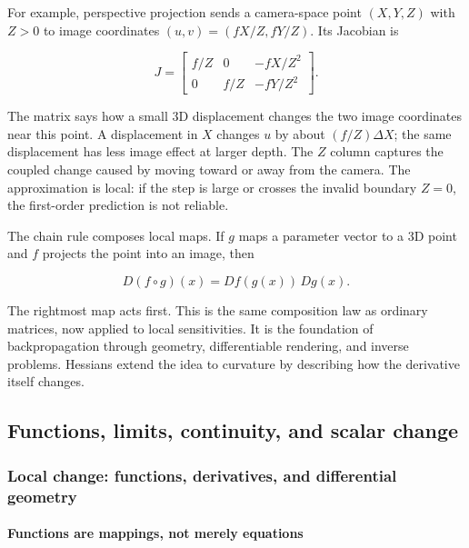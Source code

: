 For example, perspective projection sends a camera-space point \((X,Y,Z)\) with \(Z>0\) to image coordinates \((u,v)=(fX/Z,fY/Z)\). Its Jacobian is

\[
J=\begin{bmatrix}
f/Z & 0 & -fX/Z^2\\
0 & f/Z & -fY/Z^2
\end{bmatrix}.
\]

The matrix says how a small 3D displacement changes the two image coordinates near this point. A displacement in \(X\) changes \(u\) by about \((f/Z)\Delta X\); the same displacement has less image effect at larger depth. The \(Z\) column captures the coupled change caused by moving toward or away from the camera. The approximation is local: if the step is large or crosses the invalid boundary \(Z=0\), the first-order prediction is not reliable.

The chain rule composes local maps. If \(g\) maps a parameter vector to a 3D point and \(f\) projects the point into an image, then

\[
D(f\circ g)(x)=Df(g(x))\,Dg(x).
\]

The rightmost map acts first. This is the same composition law as ordinary matrices, now applied to local sensitivities. It is the foundation of backpropagation through geometry, differentiable rendering, and inverse problems. Hessians extend the idea to curvature by describing how the derivative itself changes.

\subsection{Functions, limits, continuity, and scalar change}\label{01-foundations-i-ch020-functions-limits-continuity-and-scalar-change}

\hypertarget{01-foundations-i-ch020-functions-limits-continuity-and-scalar-change}{}

\subsubsection{Local change: functions, derivatives, and differential geometry}\label{01-foundations-i-ch020-local-change-functions-derivatives-and-differential-geometry}

\hypertarget{01-foundations-i-ch020-local-change-functions-derivatives-and-differential-geometry}{}

\paragraph{Functions are mappings, not merely equations}\label{01-foundations-i-ch020-functions-are-mappings-not-merely-equations}

